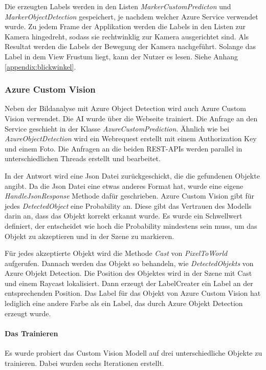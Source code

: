 Die erzeugten Labels werden in den Listen \textit{MarkerCustomPredicton} und \textit{MarkerObjectDetection} gespeichert, je nachdem welcher Azure Service verwendet wurde. 
Zu jedem Frame der Applikation werden die Labels in den Listen zur Kamera hingedreht, sodass sie rechtwinklig zur Kamera ausgerichtet sind. Als Resultat werden die Labels der Bewegung der Kamera nachgeführt. Solange das Label in dem View Frustum liegt, kann der Nutzer es lesen. Siehe Anhang \ref{appendix:blickwinkel}.

\subsubsection{Azure Custom Vision}

Neben der Bildanalyse mit Azure Object Detection wird auch Azure Custom Vision verwendet. Die AI wurde über die Webseite trainiert. Die Anfrage an den Service geschieht in der Klasse \textit{AzureCustomPrediction}. Ähnlich wie bei \textit{AzureObjectDetection} wird ein Webrequest erstellt mit einem Authorization Key und einem Foto. Die Anfragen an die beiden REST-APIs werden parallel in unterschiedlichen Threads erstellt und bearbeitet.

In der Antwort wird eine Json Datei zurückgeschickt, die die gefundenen Objekte angibt. Da die Json Datei eine etwas anderes Format hat, wurde eine eigene \textit{HandleJsonResponse} Methode dafür geschrieben. Azure Custom Vision gibt für jedes \textit{DetectedObject} eine Probability an. Diese gibt das Vertrauen des Modells darin an, dass das Objekt korrekt erkannt wurde. Es wurde ein Schwellwert definiert, der entscheidet wie hoch die Probability mindestens sein muss, um das Objekt zu akzeptieren und in der Szene zu markieren.

Für jedes akzeptierte Objekt wird die Methode \textit{Cast} von \textit{PixelToWorld} aufgerufen. Dannach werden das Objekt so behandeln, wie \textit{DetectedObjekts} von Azure Objekt Detection. Die Position des Objektes wird in der Szene mit Cast und einem Raycast lokalisiert. Dann erzeugt der LabelCreater ein Label an der entsprechenden Position. Das Label für das Objekt von Azure Custom Vision hat lediglich eine andere Farbe als ein Label, das durch Azure Objekt Detection erzeugt wurde. 

\paragraph{Das Trainieren}

Es wurde probiert das Custom Vision Modell auf drei unterschiedliche Objekte zu trainieren.
Dabei wurden sechs Iterationen erstellt. 


